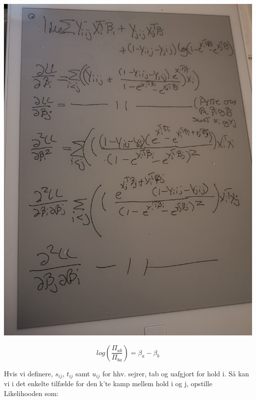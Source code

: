 \documentclass[11pt,a4paper]{article}
\begin{document}
\begin{center}
    \includegraphics[scale=0.1]{ifmbt.jpg}
\end{center}

\begin{equation}
log(\frac{\Pi_{ab}}{\Pi_{ba}}) = \beta_a-\beta_b
\end{equation}

Hvis vi definere, $s_{ij}$, $t_{ij}$ samt $u_{ij}$ for hhv. sejrer, tab og uafgjort for hold i. Så kan vi i det enkelte tilfælde for den k'te kamp mellem hold i og j, opstille Likelihooden som: 
\end{document}
